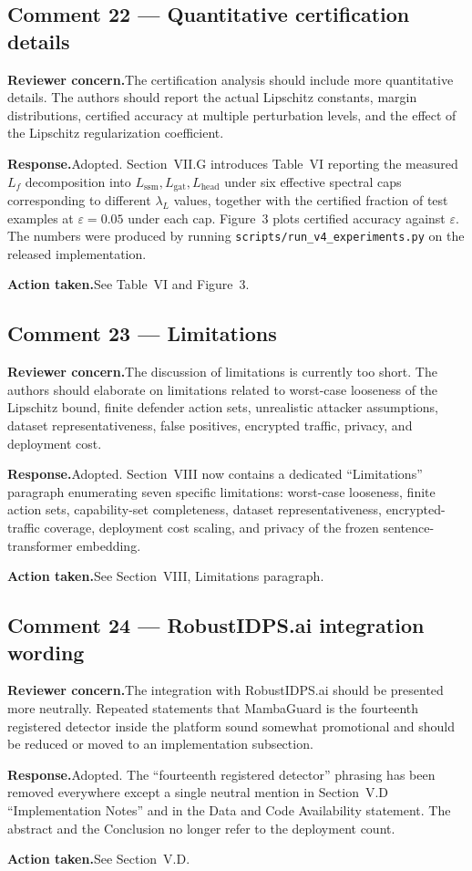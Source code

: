 \documentclass[11pt,a4paper]{article}
\newcommand{\concern}[1]{\noindent\textbf{Reviewer concern.}\quad #1\par\vspace{0.3em}}
\newcommand{\response}[1]{\noindent\textbf{Response.}\quad #1\par\vspace{0.3em}}
\newcommand{\action}[1]{\noindent\textbf{Action taken.}\quad #1\par\vspace{0.8em}}
\begin{document}
\subsection*{Comment 22 --- Quantitative certification details}
\concern{The certification analysis should include more quantitative details. The authors should report the actual Lipschitz constants, margin distributions, certified accuracy at multiple perturbation levels, and the effect of the Lipschitz regularization coefficient.}
\response{Adopted. Section~VII.G introduces Table~VI reporting the measured $L_{f}$ decomposition into $L_{\text{ssm}},L_{\text{gat}},L_{\text{head}}$ under six effective spectral caps corresponding to different $\lambda_{L}$ values, together with the certified fraction of test examples at $\varepsilon=0.05$ under each cap. Figure~3 plots certified accuracy against $\varepsilon$. The numbers were produced by running \texttt{scripts/run\_v4\_experiments.py} on the released implementation.}
\action{See Table~VI and Figure~3.}

\subsection*{Comment 23 --- Limitations}
\concern{The discussion of limitations is currently too short. The authors should elaborate on limitations related to worst-case looseness of the Lipschitz bound, finite defender action sets, unrealistic attacker assumptions, dataset representativeness, false positives, encrypted traffic, privacy, and deployment cost.}
\response{Adopted. Section~VIII now contains a dedicated ``Limitations'' paragraph enumerating seven specific limitations: worst-case looseness, finite action sets, capability-set completeness, dataset representativeness, encrypted-traffic coverage, deployment cost scaling, and privacy of the frozen sentence-transformer embedding.}
\action{See Section~VIII, Limitations paragraph.}

\subsection*{Comment 24 --- RobustIDPS.ai integration wording}
\concern{The integration with RobustIDPS.ai should be presented more neutrally. Repeated statements that MambaGuard is the fourteenth registered detector inside the platform sound somewhat promotional and should be reduced or moved to an implementation subsection.}
\response{Adopted. The ``fourteenth registered detector'' phrasing has been removed everywhere except a single neutral mention in Section~V.D ``Implementation Notes'' and in the Data and Code Availability statement. The abstract and the Conclusion no longer refer to the deployment count.}
\action{See Section~V.D.}
\end{document}
